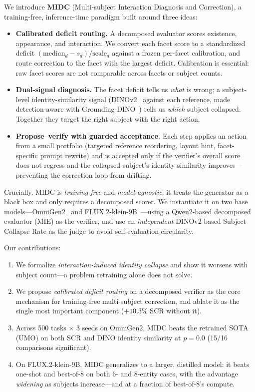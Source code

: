 \documentclass[letterpaper]{article}
\begin{document}
We introduce \textbf{MIDC} (Multi-subject Interaction Diagnosis and Correction), a training-free, inference-time paradigm built around three ideas:
\begin{itemize}
\item \textbf{Calibrated deficit routing.} A decomposed evaluator scores existence, appearance, and interaction. We convert each facet score to a standardized deficit $(\mathrm{median}_d - s_d)/\mathrm{scale}_d$ against a frozen per-facet calibration, and route correction to the facet with the largest deficit. Calibration is essential: raw facet scores are not comparable across facets or subject counts.
\item \textbf{Dual-signal diagnosis.} The facet deficit tells us \emph{what} is wrong; a subject-level identity-similarity signal (DINOv2~\citep{oquab2023dinov2} against each reference, made detection-aware with Grounding-DINO~\citep{liu2023grounding}) tells us \emph{which} subject collapsed. Together they target the right subject with the right action.
\item \textbf{Propose--verify with guarded acceptance.} Each step applies an action from a small portfolio (targeted reference reordering, layout hint, facet-specific prompt rewrite) and is accepted only if the verifier's overall score does not regress and the collapsed subject's identity similarity improves---preventing the correction loop from drifting.
\end{itemize}

Crucially, MIDC is \emph{training-free} and \emph{model-agnostic}: it treats the generator as a black box and only requires a decomposed scorer. We instantiate it on two base models---OmniGen2~\citep{wu2025omnigen2} and FLUX.2-klein-9B~\citep{blackforest2025flux2}---using a Qwen2-based decomposed evaluator (MIE) as the verifier, and use an \emph{independent} DINOv2-based Subject Collapse Rate as the judge to avoid self-evaluation circularity.

Our contributions:
\begin{enumerate}
\item We formalize \emph{interaction-induced identity collapse} and show it worsens with subject count---a problem retraining alone does not solve.
\item We propose \emph{calibrated deficit routing} on a decomposed verifier as the core mechanism for training-free multi-subject correction, and ablate it as the single most important component ($+10.3\%$ SCR without it).
\item Across 500 tasks $\times$ 3 seeds on OmniGen2, MIDC beats the retrained SOTA (UMO) on both SCR and DINO identity similarity at $p=0.0$ (15/16 comparisons significant).
\item On FLUX.2-klein-9B, MIDC generalizes to a larger, distilled model: it beats one-shot and best-of-8 on both 6- and 8-entity cases, with the advantage \emph{widening} as subjects increase---and at a fraction of best-of-8's compute.
\end{enumerate}
\end{document}
